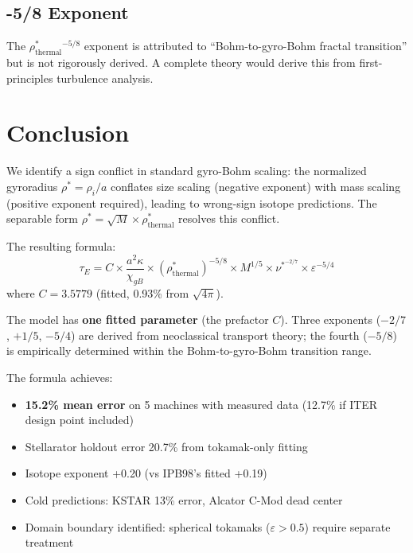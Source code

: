 \documentclass[11pt,letterpaper]{article}
\newcommand{\tauE}{\tau_E}
\newcommand{\chiGB}{\chi_{gB}}
\newcommand{\rhostar}{\rho^*}
\newcommand{\rhotherm}{\rho_{\text{thermal}}^*}
\newcommand{\nustar}{\nu^*}
\begin{document}
\subsection{-5/8 Exponent}

The $\rhotherm^{-5/8}$ exponent is attributed to ``Bohm-to-gyro-Bohm fractal transition'' but is not rigorously derived. A complete theory would derive this from first-principles turbulence analysis.

\section{Conclusion}

We identify a sign conflict in standard gyro-Bohm scaling: the normalized gyroradius $\rhostar = \rho_i/a$ conflates size scaling (negative exponent) with mass scaling (positive exponent required), leading to wrong-sign isotope predictions. The separable form $\rhostar = \sqrt{M} \times \rhotherm$ resolves this conflict.

The resulting formula:
\begin{equation}
\tauE = C \times \frac{a^2 \kappa}{\chiGB} \times (\rhotherm)^{-5/8} \times M^{1/5} \times \nustar^{-2/7} \times \varepsilon^{-5/4}
\end{equation}
where $C = 3.5779$ (fitted, 0.93\% from $\sqrt{4\pi}$).

The model has \textbf{one fitted parameter} (the prefactor $C$). Three exponents ($-2/7$, $+1/5$, $-5/4$) are derived from neoclassical transport theory; the fourth ($-5/8$) is empirically determined within the Bohm-to-gyro-Bohm transition range.

The formula achieves:
\begin{itemize}[noitemsep]
\item \textbf{15.2\% mean error} on 5 machines with measured data (12.7\% if ITER design point included)
\item Stellarator holdout error 20.7\% from tokamak-only fitting
\item Isotope exponent +0.20 (vs IPB98's fitted +0.19)
\item Cold predictions: KSTAR 13\% error, Alcator C-Mod dead center
\item Domain boundary identified: spherical tokamaks ($\varepsilon > 0.5$) require separate treatment
\end{itemize}
\end{document}
